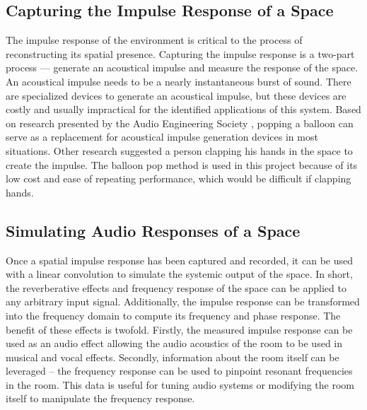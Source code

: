 \documentclass[letterpaper, 11pt, onecolumn, oneside]{article}
\begin{document}
    \subsection*{Capturing the Impulse Response of a Space}
    The impulse response of the environment is critical to the process of reconstructing its spatial presence.
    Capturing the impulse response is a two-part process --- generate an acoustical impulse and measure the response of the space.
    An acoustical impulse needs to be a nearly instantaneous burst of sound.
    There are specialized devices to generate an acoustical impulse, but these devices are costly and usually impractical for the identified applications of this system.
    Based on research presented by the Audio Engineering Society \cite{abel2010estimating}, popping a balloon can serve as a replacement for acoustical impulse generation devices in most situations.
    Other research suggested a person clapping his hands in the space to create the impulse.
    The balloon pop method is used in this project because of its low cost and ease of repeating performance, which would be difficult if clapping hands.

    \subsection*{Simulating Audio Responses of a Space}
    Once a spatial impulse response has been captured and recorded, it can be used with a linear convolution to simulate the systemic output of the space.
    In short, the reverberative effects and frequency response of the space can be applied to any arbitrary input signal. Additionally, the impulse response can be transformed into the frequency domain to compute its frequency and phase response.
    The benefit of these effects is twofold. Firstly, the measured impulse response can be used as an audio effect allowing the audio acoustics of the room to be used in musical and vocal effects.
    Secondly, information about the room itself can be leveraged -- the frequency response can be used to pinpoint resonant frequencies in the room.
    This data is useful for tuning audio systems or modifying the room itself to manipulate the frequency response.

\end{document}
